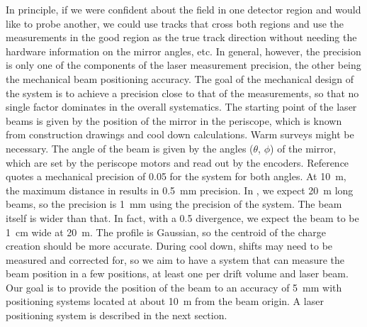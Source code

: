 In principle, if we were confident about the field in one detector region and would like to probe another, we could use tracks that cross both regions and use the  measurements in the good region as the true track direction without needing the hardware information on the mirror angles, etc. In general, however, the  precision is only one of the components of the laser measurement precision, the other being the mechanical beam positioning accuracy. The goal of the mechanical design of the system is to achieve a precision close to that of the  measurements, so that no single factor dominates in the overall systematics. The starting point of the laser beams is given by the position of the mirror in the periscope, which is known from construction drawings and cool down calculations. Warm surveys might be necessary. The angle of the beam is given by the angles ($\theta$, $\phi$) of the mirror, which are set by the periscope motors and read out by the encoders. 
Reference~\cite{bib:chen2018} quotes a mechanical precision of \SI{0.05}{\mrad} for the  system for both angles. At \SI{10}{\m}, the maximum distance in  
 results in \SI{0.5}{\milli\m} precision. In , we 
expect \SI{20}{\m} long beams, so the precision is \SI{1}{\milli\m} 
using the precision of the  system. The beam itself is wider than that. In fact, with a \SI{0.5}{\mrad} divergence, we expect the beam to be \SI{1}{\cm} wide at \SI{20}{\m}. The profile is Gaussian, so the centroid of the charge creation should be more accurate. During cool down, shifts may need to be measured and corrected for, so we aim to have a system that can measure the beam position in a few positions, at least one per drift volume and laser beam. Our goal is to provide the position of the beam to an accuracy of \SI{5}{\milli\m} with positioning systems located at about \SI{10}{\m} from the beam origin. A laser positioning system is described in the next section.

 
 


